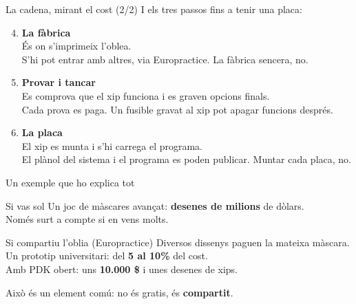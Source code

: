 \documentclass[catalan]{beamer}
\begin{document}
\begin{frame}{La cadena, mirant el cost (2/2)}
  I els tres passos fins a tenir una placa:
  \vspace{0.35cm}
  \begin{enumerate}
    \setcounter{enumi}{3}
    \setlength{\itemsep}{0.55em}
    \item \textbf{La fàbrica}\\
      És on s'imprimeix l'oblea.\\
      \textcolor{green!50!black}{S'hi pot entrar amb altres, via Europractice.}
      \textcolor{red!65!black}{La fàbrica sencera, no.}
    \item \textbf{Provar i tancar}\\
      Es comprova que el xip funciona i es graven opcions finals.\\
      \textcolor{red!65!black}{Cada prova es paga.}
      \textcolor{orange!80!black}{Un fusible gravat al xip pot apagar funcions després.}
    \item \textbf{La placa}\\
      El xip es munta i s'hi carrega el programa.\\
      \textcolor{green!50!black}{El plànol del sistema i el programa es poden publicar.}
      \textcolor{red!65!black}{Muntar cada placa, no.}
  \end{enumerate}
\end{frame}

\begin{frame}{Un exemple que ho explica tot}
  \begin{alertblock}{Si vas sol}
    Un joc de màscares avançat: \textbf{desenes de milions} de dòlars.\\
    Només surt a compte si en vens molts.
  \end{alertblock}
  \vspace{0.35cm}
  \begin{exampleblock}{Si compartiu l'oblia (Europractice)}
    Diversos dissenys paguen la mateixa màscara.\\
    Un prototip universitari: del \textbf{5 al 10\%} del cost.\\
    Amb PDK obert: uns \textbf{10.000 \$} i unes desenes de xips.
  \end{exampleblock}
  \vspace{0.35cm}
  Això és un element comú: no és gratis, és \textbf{compartit}.
\end{frame}
\end{document}
